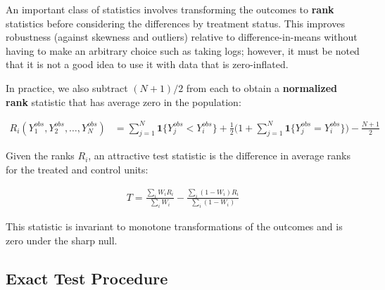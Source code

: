 An important class of statistics involves transforming the outcomes to \textbf{rank} statistics before considering the differences by treatment status.
This improves robustness (against skewness and outliers) relative to difference-in-means without having to make an arbitrary choice such as taking logs; however, it must be noted that it is not a good idea to use it with data that is zero-inflated.

In practice, we also subtract $(N+1)/2$ from each to obtain a \textbf{normalized rank} statistic that has average zero in the population:

\begin{align}
    R_i(Y_1^{obs}, Y_2^{obs}, \dots, Y_N^{obs}) &= \sum_{j=1}^N \mathbf{1}\{Y_j^{obs} < Y_i^{obs}\} + \frac{1}{2}\biggl(1+\sum_{j=1}^N \mathbf{1}\{Y_j^{obs} = Y_i^{obs}\}\biggr) - \frac{N+1}{2}
\end{align}

Given the ranks $R_i$, an attractive test statistic is the difference in average ranks for the treated and control units:

\begin{align}
T = \frac{\sum_i W_iR_i}{\sum_iW_i} - \frac{\sum_i (1-W_i)R_i}{\sum_i (1-W_i)}
\end{align}

This statistic is invariant to monotone transformations of the outcomes and is zero under the sharp null.

\subsection{Exact Test Procedure}

